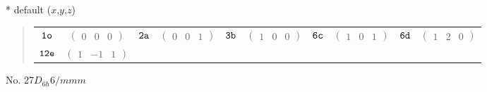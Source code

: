 \documentclass[fleqn,9pt,landscape]{jsarticle}
\begin{document}
* default ($x$,$y$,$z$)
\begin{quote}
\begin{tabular}{cccccccccc}
$ {\tt 1o} $ & $ \begin{pmatrix} 0 & 0 & 0 \end{pmatrix} $ & $ {\tt 2a} $ & $ \begin{pmatrix} 0 & 0 & 1 \end{pmatrix} $ & $ {\tt 3b} $ & $ \begin{pmatrix} 1 & 0 & 0 \end{pmatrix} $ & $ {\tt 6c} $ & $ \begin{pmatrix} 1 & 0 & 1 \end{pmatrix} $ & $ {\tt 6d} $ & $ \begin{pmatrix} 1 & 2 & 0 \end{pmatrix} $ \\
$ {\tt 12e} $ & $ \begin{pmatrix} 1 & -1 & 1 \end{pmatrix} $ & $  $ & $  $ & $  $ & $  $ & $  $ & $  $ & $  $ & $  $
\end{tabular}
\end{quote}
\newpage
No. 27\quad$D_{6h}$\quad$6/mmm$\quad[ hexagonal ]
\end{document}
